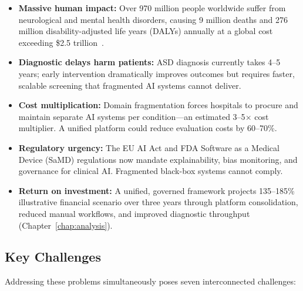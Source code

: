 \begin{itemize}[leftmargin=*, itemsep=3pt]
    \item \textbf{Massive human impact:} Over 970 million people worldwide suffer from neurological and mental health disorders, causing 9 million deaths and 276 million disability-adjusted life years (DALYs) annually at a global cost exceeding \$2.5 trillion~\cite{who2024neuro}.
    \item \textbf{Diagnostic delays harm patients:} ASD diagnosis currently takes 4--5 years; early intervention dramatically improves outcomes but requires faster, scalable screening that fragmented AI systems cannot deliver.
    \item \textbf{Cost multiplication:} Domain fragmentation forces hospitals to procure and maintain separate AI systems per condition---an estimated 3--5$\times$ cost multiplier. A unified platform could reduce evaluation costs by 60--70\%.
    \item \textbf{Regulatory urgency:} The EU AI Act and FDA Software as a Medical Device (SaMD) regulations now mandate explainability, bias monitoring, and governance for clinical AI. Fragmented black-box systems cannot comply.
    \item \textbf{Return on investment:} A unified, governed framework projects 135--185\% illustrative financial scenario over three years through platform consolidation, reduced manual workflows, and improved diagnostic throughput (Chapter~\ref{chap:analysis}).
\end{itemize}

\subsection{Key Challenges}
\label{sec:key_challenges}

Addressing these problems simultaneously poses seven interconnected challenges:

